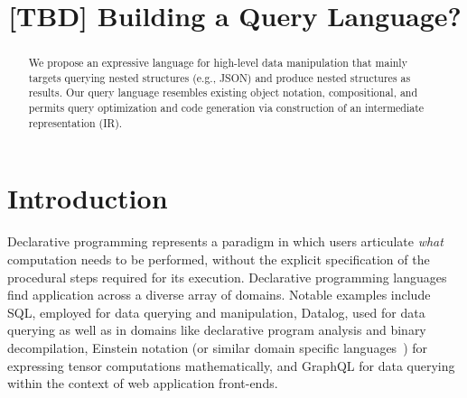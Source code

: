 \documentclass[runningheads]{llncs}
\begin{document}
%
\title{[TBD] Building a Query Language?}

%
%
%
\maketitle              %
%
\begin{abstract}
We propose an expressive language for high-level data manipulation that
mainly targets querying nested structures (e.g., JSON) and produce nested
structures as results.
Our query language resembles existing object notation, compositional, and
permits query optimization and code generation via construction of an
intermediate representation (IR).


\end{abstract}
%
%
%
\section{Introduction}\label{sec:intro}


Declarative programming represents a paradigm in which users articulate \emph{what}
computation needs to be performed, without the explicit specification of the
procedural steps required for its execution.
Declarative programming languages find application across a diverse array of
domains.
Notable examples include SQL, employed for data querying and manipulation,
Datalog, used for data querying as well as in domains like declarative program
analysis and binary decompilation, Einstein notation (or similar domain
specific languages~\cite{tensor_comprehensions}) for expressing tensor computations
mathematically, and GraphQL for data querying within the context of web application
front-ends.
\end{document}
